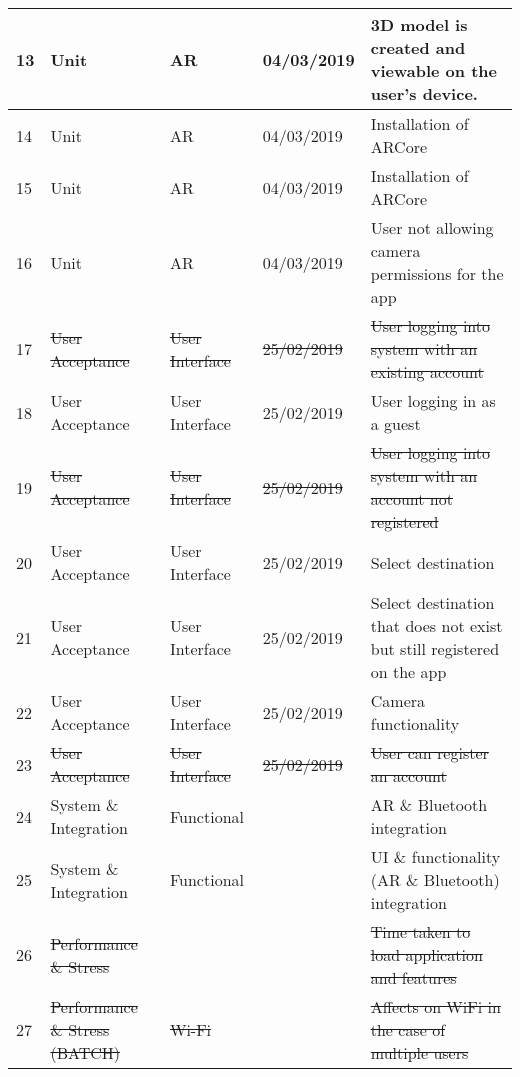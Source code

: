 \begin{turn}{-0}
\begin{tabular}{ | l | l | l | l | l |}
	13 & Unit & AR & 04/03/2019& 3D model is created and viewable on the user's device.   \\ \hline
	
	14 & Unit & AR & 04/03/2019 & Installation of ARCore\\ \hline
	
	15 & Unit & AR & 04/03/2019 & Installation of ARCore\\ \hline
	
	16 & Unit & AR & 04/03/2019& User not allowing camera permissions for the app\\  \hline
	
	17 & \sout{User Acceptance} & \sout{User Interface} & \sout{25/02/2019} & \sout{User logging into system with an existing account}\\ \hline
	
	18 & User Acceptance & User Interface & 25/02/2019 & User logging in as a guest\\ \hline
	
	19 & \sout{User Acceptance} & \sout{User Interface} & \sout{25/02/2019} & \sout{User logging into system with an account not registered}\\ \hline
	
	20 & User Acceptance & User Interface &25/02/2019 & Select destination\\ \hline
	
	21 & User Acceptance & User Interface & 25/02/2019& Select destination that does not exist but still registered on the app\\ \hline
	
	22 & User Acceptance & User Interface & 25/02/2019 & Camera functionality\\ \hline
	
	23 & \sout{User Acceptance} & \sout{User Interface} & \sout{25/02/2019} & \sout{User can register an account}\\ \hline
	
	24 & System \& Integration & Functional &  & AR \& Bluetooth integration\\ \hline
	
	25 & System \& Integration & Functional &  & UI \& functionality (AR \& Bluetooth) integration\\ \hline
	
	26 & \sout{Performance \& Stress} &  &  & \sout{Time taken to load application and features}\\ \hline
	
	27 & \sout{Performance \& Stress (BATCH)} & \sout{Wi-Fi} &  & \sout{Affects on WiFi in the case of multiple users}\\ \hline
	

\end{tabular}
\end{turn}
